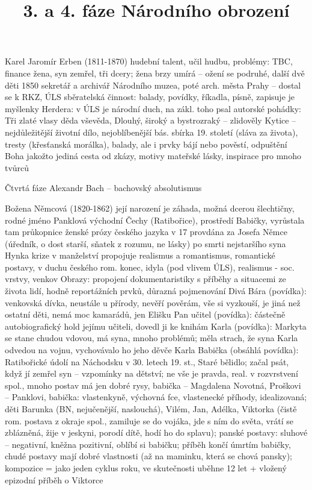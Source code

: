 \documentclass{article}
\title{\vspace{-2cm}3. a 4. fáze Národního obrození\vspace{-1.7cm}}
\date{}
\author{}
\begin{document}
\maketitle







Karel Jaromír Erben (1811-1870)
hudební talent, učil hudbu, problémy: TBC, finance
žena, syn zemřel, tři dcery; žena brzy umírá -- ožení se podruhé, další dvě děti
1850 sekretář a archivář Národního muzea, poté arch. města Prahy – dostal se k RKZ, ÚLS
sběratelská činnost: balady, povídky, říkadla, písně, zapisuje je
myšlenky Herdera: v ÚLS je národní duch, na zákl. toho psal autorské pohádky: Tři zlaté vlasy děda vševěda, Dlouhý, široký a bystrozraký -- zlidověly
Kytice – nejdůležitější životní dílo, nejoblíbenější bás. sbírka 19. století (sláva za života), tresty (křesťanská morálka), balady, ale i prvky bájí nebo pověstí, odpuštění Boha jakožto jediná cesta od zkázy, motivy mateřské lásky, inspirace pro mnoho tvůrců

Čtvrtá fáze
Alexandr Bach -- bachovský absolutismus

Božena Němcová (1820-1862)
její narození je záhada, možná dcerou šlechtičny, rodné jméno Panklová
východní Čechy (Ratibořice), prostředí Babičky, vyrůstala tam
průkopnice ženské prózy českého jazyka
v 17 provdána za Josefa Němce (úředník, o dost starší, sňatek z rozumu, ne lásky)
po smrti nejstaršího syna Hynka krize v manželství
propojuje realismus a romantismus, romantické postavy, v duchu českého rom. konec, idyla (pod vlivem ÚLS), realismus - soc. vrstvy, venkov
Obrazy: propojení dokumentaristiky s příběhy a situacemi ze života lidí, hodně reportážních prvků, důrazná pojmenování
Divá Bára (povídka): venkovská dívka, neustále u přírody, nevěří pověrám, vše si vyzkouší, je jiná než ostatní děti, nemá moc kamarádů, jen Elišku
Pan učitel (povídka): částečně autobiografický hold jejímu učiteli, dovedl ji ke knihám
Karla (povídka): Markyta se stane chudou vdovou, má syna, mnoho problémů; měla strach, že syna Karla odvedou na vojnu, vychovávalo ho jeho děvče Karla
Babička (obsáhlá povídka): Ratibořické údolí na Náchodsku v 30. letech 19. st., Staré bělidlo; začal psát, když jí zemřel syn -- vzpomínky na dětství; ne vše je pravda, real. v rozvrstvení spol., mnoho postav má jen dobré rysy, babička – Magdalena Novotná, Proškovi – Panklovi, babička: vlastenkyně, výchovná fce, vlastenecké příhody, idealizovaná; děti Barunka (BN, nejučenější, naslouchá), Vilém, Jan, Adélka, Viktorka (čistě rom. postava z okraje spol., zamiluje se do vojáka, jde s ním do světa, vrátí se zblázněná, žije v jeskyni, porodí dítě, hodí ho do splavu); panské postavy: sluhové – negativní, kněžna pozitivní, oblíbí si babičku; příběh končí úmrtím babičky, chudé postavy mají dobré vlastnosti (až na maminku, která se chová pansky); kompozice = jako jeden cyklus roku, ve skutečnosti uběhne 12 let + vložený epizodní příběh o Viktorce
\end{document}
